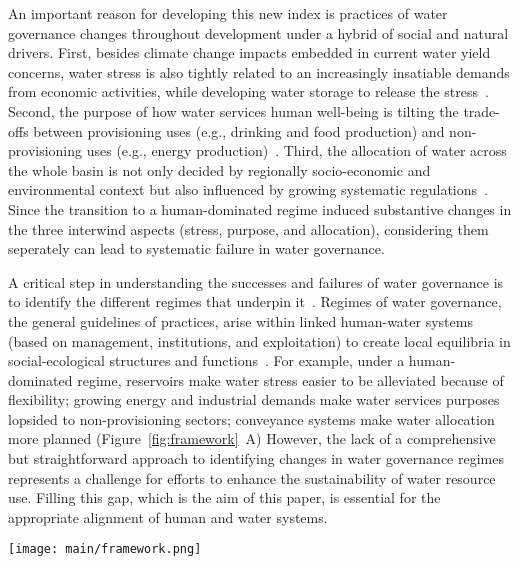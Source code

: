An important reason for developing this new index is practices of water governance changes throughout development under a hybrid of social and natural drivers.
First, besides climate change impacts embedded in current water yield concerns, water stress is also tightly related to an increasingly insatiable demands from economic activities, while developing water storage to release the stress~\cite{qin2019,wada2014,huang2021}.
Second, the purpose of how water services human well-being is tilting the trade-offs between provisioning uses (e.g., drinking and food production) and non-provisioning uses (e.g., energy production)~\cite{liu2017,florke2018,jaeger2019}.
Third, the allocation of water across the whole basin is not only decided by regionally socio-economic and environmental context but also influenced by growing systematic regulations~\cite{schmandt2021,speed2013}.
Since the transition to a human-dominated regime induced substantive changes in the three interwind aspects (stress, purpose, and allocation), considering them seperately can lead to systematic failure in water governance.

A critical step in understanding the successes and failures of water governance is to identify the different regimes that underpin it~\cite{kjellen2015, grafton2013}.
Regimes of water governance, the general guidelines of practices, arise within linked human-water systems (based on management, institutions, and exploitation) to create local equilibria in social-ecological structures and functions~\cite{falkenmark2021,bressers2013,loch2020,pahl-wostl2007}.
For example, under a human-dominated regime, reservoirs make water stress easier to be alleviated because of flexibility; growing energy and industrial demands make water services purposes lopsided to non-provisioning sectors; conveyance systems make water allocation more planned (Figure~\ref{fig:framework}~A)
However, the lack of a comprehensive but straightforward approach to identifying changes in water governance regimes represents a challenge for efforts to enhance the sustainability of water resource use.
Filling this gap, which is the aim of this paper, is essential for the appropriate alignment of human and water systems.


\begin{figure*}[!ht]
	\centering
	\texttt{[image: main/framework.png]}
	\caption{
		Identifying the water governance regimes in transitions of a hydrosocial cycle with an integrated water governance index (IWGI). Water stress (S), purposes of water services (P), and water allocation (A) are three aspects to be considered (\textbf{A.}). Along with hydrosocial-cycle transitions, a human-dominated regime influences these aspects of water governance. For example, the construction of reservoirs (1) aims to alleviate water stress; growth of energy and industry (2); water-lead intensive agriculture (3); conveyance system (4) controls water allocation.
		Therefore, the methodology is to combine three aspects' corresponding indicators, and then an abrupt change of the IWGI can indicate a regime shift in water governance (\textbf{B.}).
	}\label{fig:framework}
\end{figure*}



